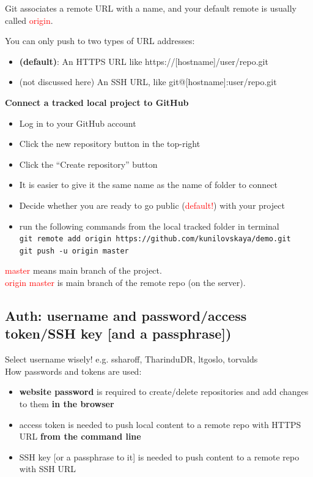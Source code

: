 \documentclass[a4paper,11pt]{article}
\begin{document}
Git associates a remote URL with a name, and your default remote is usually called \textcolor{red}{origin}.

You can only push to two types of URL addresses:

\begin{itemize}
	\item \textbf{(default)}: An HTTPS URL like https://[hostname]/user/repo.git 
	\item (not discussed here) An SSH URL, like git@[hostname]:user/repo.git
\end{itemize}

\textbf{Connect a tracked local project to GitHub}

\begin{itemize}
	\item Log in to your GitHub account
	\item Click the new repository button in the top-right
	\item Click the ``Create repository'' button
	\item It is easier to give it the same name as the name of folder to connect
	\item Decide whether you are ready to go public (\textcolor{red}{default!}) with your project
	\item run the following commands from the local tracked folder in terminal \\
	
	\verb|git remote add origin https://github.com/kunilovskaya/demo.git| \\
	\verb|git push -u origin master|
\end{itemize}

\textcolor{red}{master} means main branch of the project. \\
\textcolor{red}{origin master} is main branch of the remote repo (on the server).

\subsection{Auth: username and password/access token/SSH key [and a passphrase])}

Select username wisely! e.g. ssharoff, TharinduDR, ltgoslo, torvalds \\

How passwords and tokens are used: 

\begin{itemize}
	\item \textbf{website password} is required to create/delete repositories and add changes to them \textbf{in the browser}
	\item access token is needed to push local content to a remote repo with HTTPS URL \textbf{from the command line}
	\item SSH key [or a passphrase to it] is needed to push content to a remote repo with SSH URL	
\end{itemize}
\end{document}
